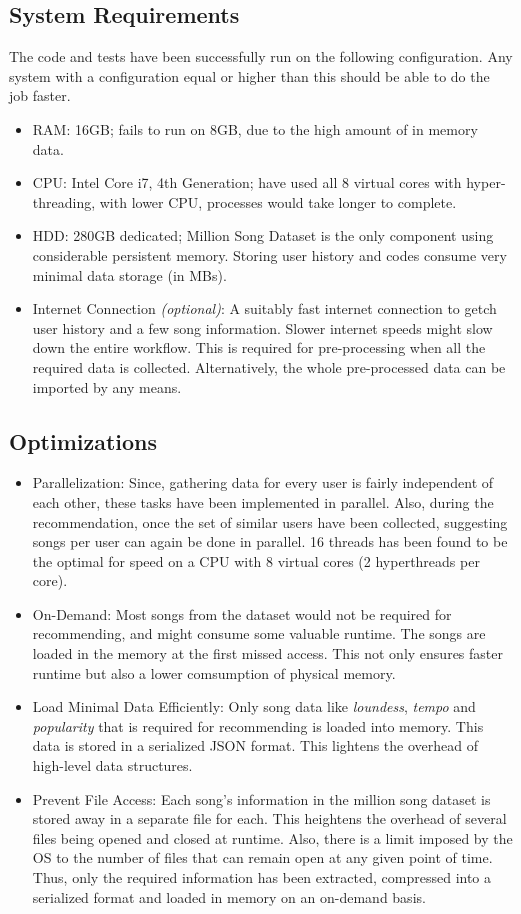 		\subsection{System Requirements}
		The code and tests have been successfully run on the following configuration. Any system with a configuration equal or higher than this should be able to do the job faster.
\begin{itemize}
	\item RAM: 16GB; fails to run on 8GB, due to the high amount of in memory data.
	\item CPU: Intel Core i7, 4th Generation; have used all 8 virtual cores with hyper-threading, with lower CPU, processes would take longer to complete.
	\item HDD: 280GB dedicated; Million Song Dataset is the only component using considerable persistent memory. Storing user history and codes consume very minimal data storage (in MBs).
	\item Internet Connection \emph{(optional)}: A suitably fast internet connection to getch user history and a few song information. Slower internet speeds might slow down the entire workflow. This is required for pre-processing when all the required data is collected. Alternatively, the whole pre-processed data can be imported by any means.
\end{itemize}
		
		\subsection{Optimizations}
\begin{itemize}
	\item Parallelization: Since, gathering data for every user is fairly independent of each other, these tasks have been implemented in parallel. Also, during the recommendation, once the set of similar users have been collected, suggesting songs per user can again be done in parallel. 16 threads has been found to be the optimal for speed on a CPU with 8 virtual cores (2 hyperthreads per core).
	\item On-Demand: Most songs from the dataset would not be required for recommending, and might consume some valuable runtime. The songs are loaded in the memory at the first missed access. This not only ensures faster runtime but also a lower comsumption of physical memory.
	\item Load Minimal Data Efficiently: Only song data like \emph{loundess}, \emph{tempo} and \emph{popularity} that is required for recommending is loaded into memory. This data is stored in a serialized JSON format. This lightens the overhead of high-level data structures.
	\item Prevent File Access: Each song's information in the million song dataset is stored away in a separate file for each. This heightens the overhead of several files being opened and closed at runtime. Also, there is a limit imposed by the OS to the number of files that can remain open at any given point of time. Thus, only the required information has been extracted, compressed into a serialized format and loaded in memory on an on-demand basis.
\end{itemize}
	
